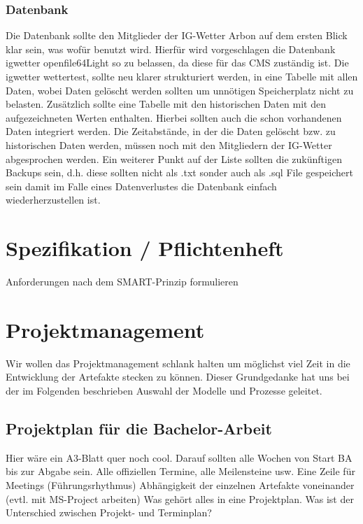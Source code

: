 \documentclass[a4paper,ngerman, 11pt]{report}
\begin{document}
\subsection{Datenbank}
Die Datenbank sollte den Mitglieder der IG-Wetter Arbon auf dem ersten Blick klar sein, was wofür benutzt wird. Hierfür wird vorgeschlagen die Datenbank igwetter openfile64Light so zu belassen, da diese für das CMS zuständig ist. Die igwetter wettertest, sollte neu klarer strukturiert werden, in eine Tabelle mit allen Daten, wobei Daten gelöscht werden sollten um unnötigen Speicherplatz nicht zu belasten. Zusätzlich sollte eine Tabelle mit den historischen Daten mit den aufgezeichneten Werten enthalten. Hierbei sollten auch die schon vorhandenen Daten integriert werden. Die Zeitabstände, in der die Daten gelöscht bzw. zu historischen Daten werden, müssen noch mit den Mitgliedern der IG-Wetter abgesprochen werden. Ein weiterer Punkt auf der Liste sollten die zukünftigen Backups sein, d.h. diese sollten nicht als .txt sonder auch als .sql File gespeichert sein damit im Falle eines Datenverlustes die Datenbank einfach wiederherzustellen ist.


\chapter{Spezifikation / Pflichtenheft}
Anforderungen nach dem SMART-Prinzip formulieren
   


\chapter{Projektmanagement}
Wir wollen das Projektmanagement schlank halten um möglichst viel Zeit in die Entwicklung der Artefakte stecken zu können.
Dieser Grundgedanke hat uns bei der im Folgenden beschrieben Auswahl der Modelle und Prozesse geleitet.



\section{Projektplan für die Bachelor-Arbeit}
Hier wäre ein A3-Blatt quer noch cool. Darauf sollten alle Wochen von Start BA bis zur Abgabe sein.
Alle offiziellen Termine, alle Meilensteine usw.
Eine Zeile für Meetings (Führungsrhythmus)
Abhängigkeit der einzelnen Artefakte voneinander (evtl. mit MS-Project arbeiten)
Was gehört alles in eine Projektplan. Was ist der Unterschied zwischen Projekt- und Terminplan?
\end{document}
